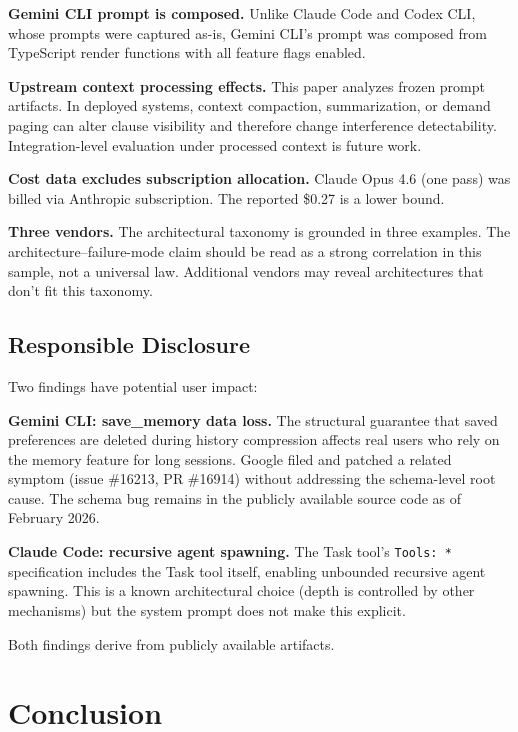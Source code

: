 \documentclass[11pt,a4paper]{article}
\begin{document}
\textbf{Gemini CLI prompt is composed.} Unlike Claude Code and Codex
CLI, whose prompts were captured as-is, Gemini CLI's prompt was
composed from TypeScript render functions with all feature flags
enabled.

\textbf{Upstream context processing effects.} This paper analyzes frozen
prompt artifacts. In deployed systems, context compaction, summarization,
or demand paging can alter clause visibility and therefore change
interference detectability. Integration-level evaluation under processed
context is future work.

\textbf{Cost data excludes subscription allocation.} Claude Opus 4.6
(one pass) was billed via Anthropic subscription. The reported \$0.27
is a lower bound.

\textbf{Three vendors.} The architectural taxonomy is grounded in three
examples. The architecture--failure-mode claim should be read as a
strong correlation in this sample, not a universal law. Additional
vendors may reveal architectures that don't fit this taxonomy.


\subsection{Responsible Disclosure}

Two findings have potential user impact:

\textbf{Gemini CLI: save\_memory data loss.} The structural guarantee
that saved preferences are deleted during history compression affects
real users who rely on the memory feature for long sessions. Google
filed and patched a related symptom (issue \#16213, PR \#16914) without
addressing the schema-level root cause. The schema bug remains in the
publicly available source code as of February 2026.

\textbf{Claude Code: recursive agent spawning.} The Task tool's
\texttt{Tools: *} specification includes the Task tool itself, enabling
unbounded recursive agent spawning. This is a known architectural
choice (depth is controlled by other mechanisms) but the system prompt
does not make this explicit.

Both findings derive from publicly available artifacts.


\section{Conclusion}
\label{sec:conclusion}
\end{document}

